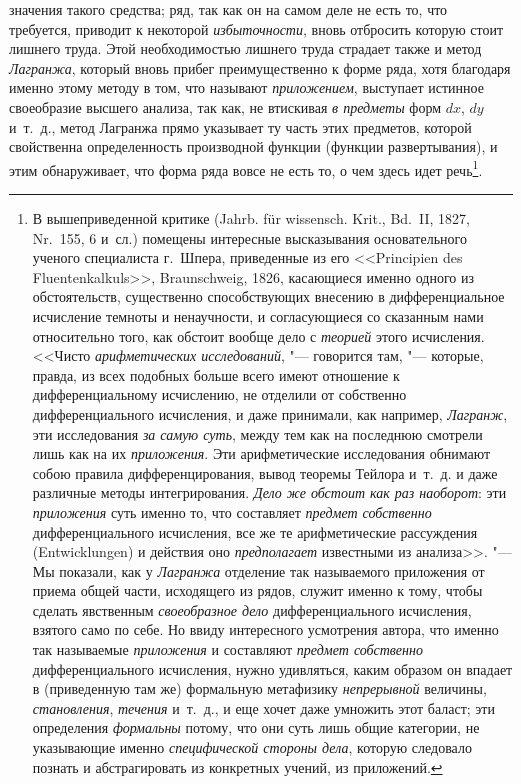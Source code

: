 значения такого средства; ряд, так как он на самом деле не есть то, что
требуется, приводит к некоторой {\em избыточности},
вновь отбросить которую стоит лишнего труда. Этой необходимостью лишнего
труда страдает также и метод {\em Лагранжа}, который
вновь прибег преимущественно к форме ряда, хотя благодаря именно этому
методу в том, что называют {\em приложением}, выступает
истинное своеобразие высшего анализа, так как, не втискивая
{\em в предметы} форм $dx$, $dy$ и~т.~д., метод Лагранжа прямо указывает ту
часть этих предметов, которой свойственна определенность производной
функции (функции развертывания), и этим обнаруживает, что форма ряда вовсе
не есть то, о чем здесь идет речь\footnote{В вышеприведенной
критике (Jahrb. für wissensch. Krit., Bd.~II, 1827, Nr.~155, 6 и~сл.)
помещены интересные высказывания основательного ученого специалиста
г.~Шпера, приведенные из его <<Principien des Fluentenkalkuls>>, Braunschweig,
1826, касающиеся именно одного из обстоятельств, существенно способствующих
внесению в дифференциальное исчисление темноты и ненаучности, и
согласующиеся со сказанным нами относительно того, как обстоит вообще дело
с {\em теорией} этого исчисления. <<Чисто {\em арифметических исследований},
"--- говорится там, "--- которые, правда, из всех
подобных больше всего имеют отношение к дифференциальному исчислению, не
отделили от собственно дифференциального исчисления, и даже принимали, как
например, {\em Лагранж}, эти исследования {\em за самую суть},
между тем как на последнюю смотрели лишь как на их {\em приложения}. Эти
арифметические исследования обнимают собою правила дифференцирования, вывод
теоремы Тейлора и~т.~д. и даже различные методы интегрирования.
{\em Дело же обстоит как раз наоборот}: эти {\em приложения}
суть именно то, что составляет {\em предмет собственно}
дифференциального исчисления, все же те арифметические
рассуждения (Entwicklungen) и действия оно
{\em предполагает} известными из анализа>>. "--- Мы показали, как у
{\em Лагранжа} отделение так
называемого приложения от приема общей части, исходящего из рядов, служит
именно к тому, чтобы сделать явственным {\em своеобразное дело}
дифференциального исчисления, взятого само по себе. Но ввиду
интересного усмотрения автора, что именно так называемые {\em приложения}
и составляют {\em предмет собственно} дифференциального исчисления, нужно
удивляться, каким образом он впадает в (приведенную там же) формальную
метафизику {\em непрерывной} величины, {\em становления}, {\em течения}
и~т.~д., и еще хочет даже умножить этот баласт; эти определения
{\em формальны} потому, что они суть лишь общие категории, не указывающие
именно {\em специфической стороны дела}, которую следовало познать и
абстрагировать из конкретных учений, из приложений.}.

